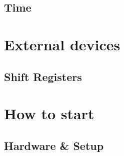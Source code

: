 \documentclass[twoside,12pt,authoryear,openright]{book}
\begin{document}







\chapter{Time}




\part{External devices}

\chapter{Shift Registers}




\part{How to start}

\chapter{Hardware & Setup}


\end{document}
